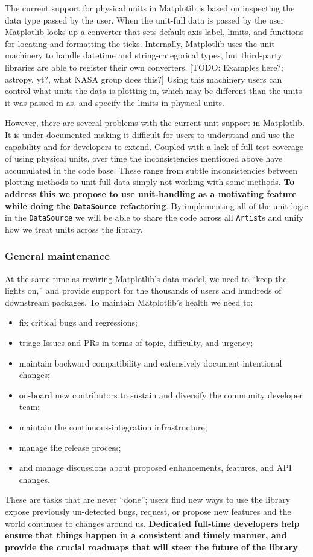 \documentclass[12pt]{article}
\numberwithin{page}{section}
\begin{document}

The current support for physical units in Matplotib is based on inspecting the data type passed by the user.  When the unit-full data is
passed by the user Matplotlib looks up a converter that sets default axis label,
limits, and functions for locating and formatting the ticks.
Internally, Matplotlib uses the unit machinery to handle datetime and string-categorical types, but third-party libraries are able to register their own converters.  [TODO: Examples here?; astropy, yt?, what NASA group does this?]
Using this machinery users can control what units the data is plotting
in, which may be different than the units it was passed in as, and
specify the limits in physical units.

However, there are several problems with the current unit support in
Matplotlib.  It is under-documented making it difficult for users to
understand and use the capability and for developers to extend.
Coupled with a lack of full test coverage of using physical units,
over time the inconsistencies mentioned above have accumulated in the
code base.  These range from subtle inconsistencies between plotting
methods to unit-full data simply not working with some methods.
\textbf{To address this we propose to use unit-handling as a
  motivating feature while doing the \texttt{DataSource} refactoring}.
By implementing all of the unit logic in the \texttt{DataSource} we
will be able to share the code across all \texttt{Artist}s and unify
how we treat units across the library.


\subsubsection{General maintenance}

At the same time as rewiring Matplotlib's data model, we need to ``keep the lights on,'' and provide support for the thousands of users and hundreds of downstream packages.
To maintain Matplotlib's health we need to:
\begin{itemize}[noitemsep]
\item fix critical bugs and regressions;
\item triage Issues and PRs in terms of topic,
  difficulty, and urgency;
\item maintain backward compatibility and extensively document
  intentional changes;
\item on-board new contributors to sustain and diversify the community developer
  team;
\item maintain the continuous-integration infrastructure;
\item manage the release process;
\item and manage discussions about proposed enhancements, features,
  and API changes.
\end{itemize}
These are tasks that are never ``done''; users find new ways to use
the library expose previously un-detected bugs, request, or propose new
features and the world continues to changes around us.   \textbf{Dedicated
full-time developers help ensure that things happen in a consistent and timely manner, and provide the crucial roadmaps that will steer the future of the library}.
\end{document}
